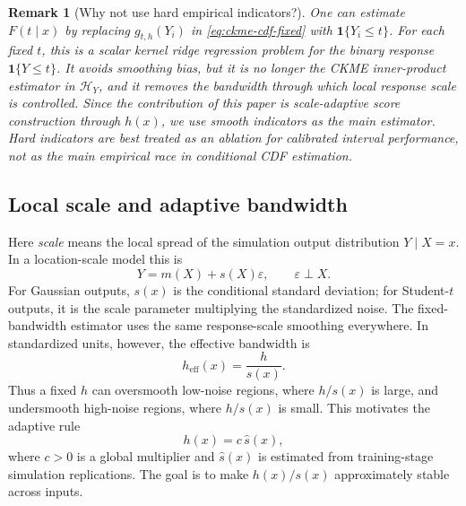 \documentclass[11pt]{article}
\newtheorem{remark}{Remark}
\newcommand{\Hcal}{\mathcal H}
\newcommand{\ind}{\mathbf 1}
\begin{document}
\begin{remark}[Why not use hard empirical indicators?]
One can estimate \(F(t\mid x)\) by replacing \(g_{t,h}(Y_i)\) in \eqref{eq:ckme-cdf-fixed} with \(\ind\{Y_i\le t\}\). For each fixed \(t\), this is a scalar kernel ridge regression problem for the binary response \(\ind\{Y\le t\}\). It avoids smoothing bias, but it is no longer the CKME inner-product estimator in \(\Hcal_Y\), and it removes the bandwidth through which local response scale is controlled. Since the contribution of this paper is scale-adaptive score construction through \(h(x)\), we use smooth indicators as the main estimator. Hard indicators are best treated as an ablation for calibrated interval performance, not as the main empirical race in conditional CDF estimation.
\end{remark}

\subsection{Local scale and adaptive bandwidth}
\label{sec:local-scale}

Here \emph{scale} means the local spread of the simulation output distribution \(Y\mid X=x\). In a location-scale model this is
\[
  Y=m(X)+s(X)\varepsilon,\qquad \varepsilon\perp X.
\]
For Gaussian outputs, \(s(x)\) is the conditional standard deviation; for Student-\(t\) outputs, it is the scale parameter multiplying the standardized noise. The fixed-bandwidth estimator uses the same response-scale smoothing everywhere. In standardized units, however, the effective bandwidth is
\[
  h_{\mathrm{eff}}(x)=\frac{h}{s(x)}.
\]
Thus a fixed \(h\) can oversmooth low-noise regions, where \(h/s(x)\) is large, and undersmooth high-noise regions, where \(h/s(x)\) is small. This motivates the adaptive rule
\begin{equation}
  h(x)=c\,\widehat s(x),
  \label{eq:adaptive-rule}
\end{equation}
where \(c>0\) is a global multiplier and \(\widehat s(x)\) is estimated from training-stage simulation replications. The goal is to make \(h(x)/s(x)\) approximately stable across inputs.
\end{document}
